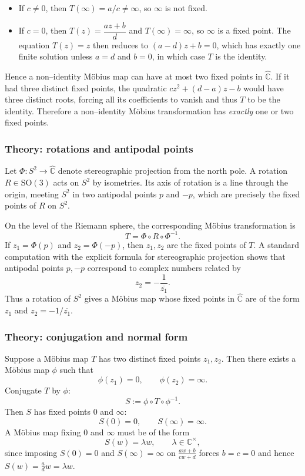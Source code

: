 \documentclass[12pt,a4paper]{article}
\theoremstyle{plain}
\theoremstyle{definition}      %
\begin{document}
\begin{itemize}
	\item If $c\neq 0$, then $T(\infty)=a/c\neq\infty$, so $\infty$ is not fixed.
	\item If $c=0$, then $T(z) = \dfrac{az+b}{d}$ and $T(\infty)=\infty$, so
	$\infty$ is a fixed point.  The equation $T(z)=z$ then reduces to
	$(a-d)z + b = 0$, which has exactly one finite solution unless
	$a=d$ and $b=0$, in which case $T$ is the identity.
\end{itemize}

Hence a non–identity M\"obius map can have at most two fixed points in
$\widehat{\mathbb{C}}$.  If it had three distinct fixed points, the
quadratic $cz^{2}+(d-a)z-b$ would have three distinct roots, forcing all its
coefficients to vanish and thus $T$ to be the identity.  Therefore a
non–identity M\"obius transformation has \emph{exactly} one or two fixed
points.

\subsubsection*{Theory: rotations and antipodal points}

Let $\Phi:S^{2}\to\widehat{\mathbb{C}}$ denote stereographic projection
from the north pole.  A rotation $R\in\mathrm{SO}(3)$ acts on $S^{2}$ by
isometries.  Its axis of rotation is a line through the origin, meeting
$S^{2}$ in two antipodal points $p$ and $-p$, which are precisely the fixed
points of $R$ on $S^{2}$.

On the level of the Riemann sphere, the corresponding M\"obius
transformation is
\[
T = \Phi\circ R\circ\Phi^{-1}.
\]
If $z_{1}=\Phi(p)$ and $z_{2}=\Phi(-p)$, then $z_{1},z_{2}$ are the fixed
points of $T$.  A standard computation with the explicit formula for
stereographic projection shows that antipodal points $p,-p$ correspond to
complex numbers related by
\[
z_{2} = -\frac{1}{\overline{z_{1}}}.
\]
Thus a rotation of $S^{2}$ gives a M\"obius map whose fixed points in
$\widehat{\mathbb{C}}$ are of the form $z_{1}$ and
$z_{2} = -1/\overline{z_{1}}$.

\subsubsection*{Theory: conjugation and normal form}

Suppose a M\"obius map $T$ has two distinct fixed points $z_{1},z_{2}$.  Then
there exists a M\"obius map $\phi$ such that
\[
\phi(z_{1})=0,\qquad \phi(z_{2})=\infty.
\]
Conjugate $T$ by $\phi$:
\[
S := \phi\circ T\circ\phi^{-1}.
\]
Then $S$ has fixed points $0$ and $\infty$:
\[
S(0)=0,\qquad S(\infty)=\infty.
\]
A M\"obius map fixing $0$ and $\infty$ must be of the form
\[
S(w) = \lambda w,\qquad \lambda\in\mathbb{C}^{\times},
\]
since imposing $S(0)=0$ and $S(\infty)=\infty$ on
$\frac{aw+b}{cw+d}$ forces $b=c=0$ and hence $S(w)=\frac{a}{d}w=\lambda w$.
\end{document}
